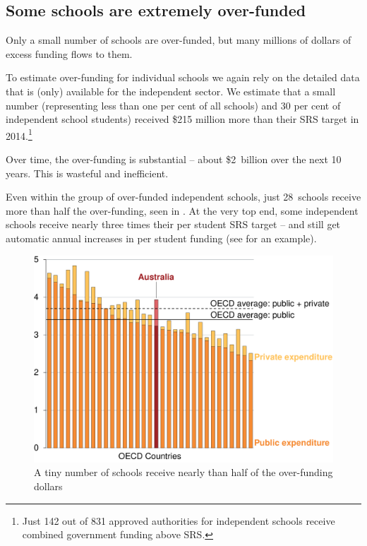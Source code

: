 \documentclass{grattan}
\begin{document}

\subsection{Some schools are extremely over-funded}\label{subsec:some-schools-are-extremely-over-funded}

Only a small number of schools are over-funded, but many millions of dollars of excess funding flows to them.

To estimate over-funding for individual schools we again rely on the detailed data that is (only) available for the independent sector. We estimate that a small number (representing less than one per cent of all schools) and 30 per cent of independent school students) received \$215 million more than their SRS target in 2014.\footnote{Just 142 out of 831 approved authorities for independent schools receive combined government funding above SRS\@.}

Over time, the over-funding is substantial -- about \$2~billion over the next 10 years.
This is wasteful and inefficient.

Even within the group of over-funded independent schools, just 28~schools receive more than half the over-funding, seen in . At the very top end, some independent schools receive nearly three times their per student SRS target -- and still get automatic annual increases in per student funding (see  for an example).

\begin{figure}
\caption{A tiny number of schools receive nearly than half of the over-funding dollars\label{fig:more-than-half-the-overfunding-goes-to-28-schools-above-150pc-of-SRS}}

\includegraphics[page=7]{atlas/Charts.pdf}
\end{figure}
\end{document}
